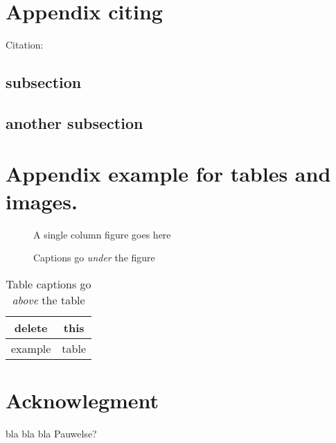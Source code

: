 \documentclass[twocolumn,english,compsoc,journal]{IEEEtran}
\providecommand{\tabularnewline}{\\}
\begin{document}
\appendices{}


\section{Appendix citing}

Citation: \cite{example:beebe_archive}

\subsection{subsection}

\subsection{another subsection}

\section{Appendix example for tables and images.}

\begin{figure}[htbp]
\begin{centering}
\textsf{A single column figure goes here}
\par\end{centering}

\protect\caption{Captions go \emph{under} the figure}
\end{figure}
\begin{table}[htbp]
\protect\caption{Table captions go \emph{above} the table}


\centering{}%
\begin{tabular}{|c|c|}
\hline 
delete & this\tabularnewline
\hline 
\hline 
example & table\tabularnewline
\hline 
\end{tabular}
\end{table}



\section*{Acknowlegment}

bla bla bla Pauwelse?



\end{document}
